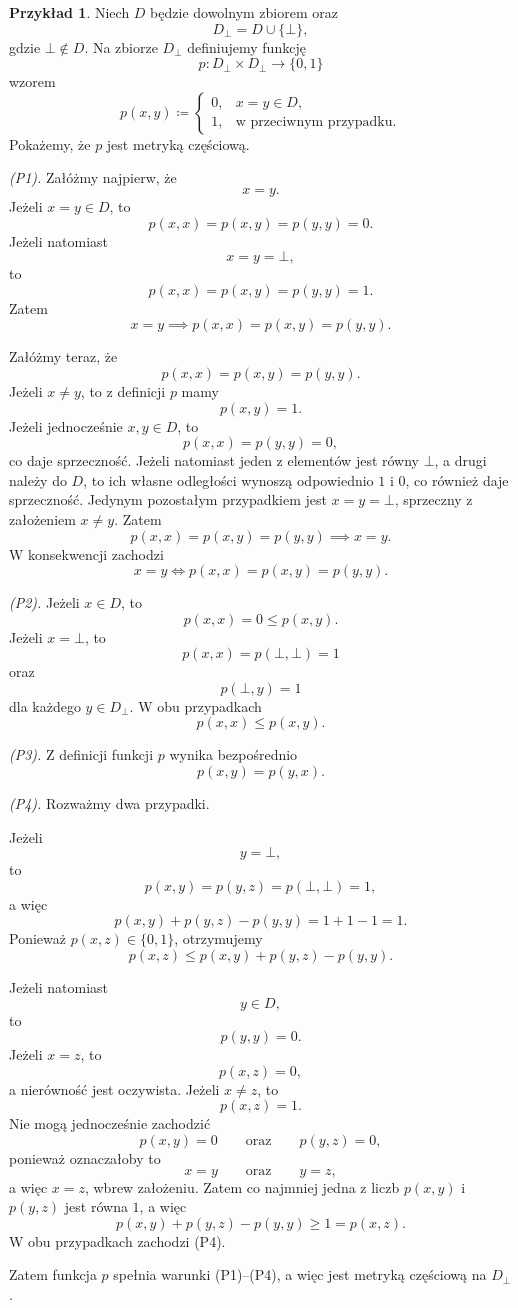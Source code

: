 \documentclass[11pt,a4paper]{article}
\theoremstyle{definition}
\newtheorem{przyklad}[definicja]{Przykład}
\theoremstyle{plain}
\newcommand{\bt}{\bot}                            %
\begin{document}
\begin{przyklad}\label{prz:plaska_pmetryka}
	Niech $D$ będzie dowolnym zbiorem oraz
	\[
	D_\bt=D\cup\{\bt\},
	\]
	gdzie $\bt\notin D$. Na zbiorze $D_\bt$ definiujemy funkcję
	\[
	p:D_\bt\times D_\bt\to\{0,1\}
	\]
	wzorem
	\[
	p(x,y)\coloneqq 
	\begin{cases}
		0,&x=y\in D,\\
		1,&\text{w przeciwnym przypadku}.
	\end{cases}
	\]
	Pokażemy, że $p$ jest metryką częściową.
	
	\emph{(P1).} Załóżmy najpierw, że
	\[
	x=y.
	\]
	Jeżeli $x=y\in D$, to
	\[
	p(x,x)=p(x,y)=p(y,y)=0.
	\]
	Jeżeli natomiast
	\[
	x=y=\bt,
	\]
	to
	\[
	p(x,x)=p(x,y)=p(y,y)=1.
	\]
	Zatem
	\[
	x=y
	\implies
	p(x,x)=p(x,y)=p(y,y).
	\]
	
	Załóżmy teraz, że
	\[
	p(x,x)=p(x,y)=p(y,y).
	\]
	Jeżeli $x\neq y$, to z definicji $p$ mamy
	\[
	p(x,y)=1.
	\]
	Jeżeli jednocześnie $x,y\in D$, to
	\[
	p(x,x)=p(y,y)=0,
	\]
	co daje sprzeczność. Jeżeli natomiast jeden z elementów jest równy
	$\bt$, a drugi należy do $D$, to ich własne odległości wynoszą odpowiednio
	$1$ i $0$, co również daje sprzeczność. Jedynym pozostałym przypadkiem
	jest $x=y=\bt$, sprzeczny z założeniem $x\neq y$. Zatem
	\[
	p(x,x)=p(x,y)=p(y,y)
	\implies
	x=y.
	\]
	W konsekwencji zachodzi
	\[
	x=y
	\iff
	p(x,x)=p(x,y)=p(y,y).
	\]
	
	\emph{(P2).} Jeżeli $x\in D$, to
	\[
	p(x,x)=0\leq p(x,y).
	\]
	Jeżeli $x=\bt$, to
	\[
	p(x,x)=p(\bt,\bt)=1
	\]
	oraz
	\[
	p(\bt,y)=1
	\]
	dla każdego $y\in D_\bt$. W obu przypadkach
	\[
	p(x,x)\leq p(x,y).
	\]
	
	\emph{(P3).} Z definicji funkcji $p$ wynika bezpośrednio
	\[
	p(x,y)=p(y,x).
	\]
	
	\emph{(P4).} Rozważmy dwa przypadki.
	
	Jeżeli
	\[
	y=\bt,
	\]
	to
	\[
	p(x,y)=p(y,z)=p(\bt,\bt)=1,
	\]
	a więc
	\[
	p(x,y)+p(y,z)-p(y,y)
	=
	1+1-1
	=
	1.
	\]
	Ponieważ $p(x,z)\in\{0,1\}$, otrzymujemy
	\[
	p(x,z)\leq
	p(x,y)+p(y,z)-p(y,y).
	\]
	
	Jeżeli natomiast
	\[
	y\in D,
	\]
	to
	\[
	p(y,y)=0.
	\]
	Jeżeli $x=z$, to
	\[
	p(x,z)=0,
	\]
	a nierówność jest oczywista. Jeżeli $x\neq z$, to
	\[
	p(x,z)=1.
	\]
	Nie mogą jednocześnie zachodzić
	\[
	p(x,y)=0
	\qquad\text{oraz}\qquad
	p(y,z)=0,
	\]
	ponieważ oznaczałoby to
	\[
	x=y
	\qquad\text{oraz}\qquad
	y=z,
	\]
	a więc $x=z$, wbrew założeniu. Zatem co najmniej jedna z liczb
	$p(x,y)$ i $p(y,z)$ jest równa $1$, a więc
	\[
	p(x,y)+p(y,z)-p(y,y)\geq1=p(x,z).
	\]
	W obu przypadkach zachodzi (P4).
	
	Zatem funkcja $p$ spełnia warunki (P1)--(P4), a więc jest metryką
	częściową na $D_\bt$.
\end{przyklad}
\end{document}
